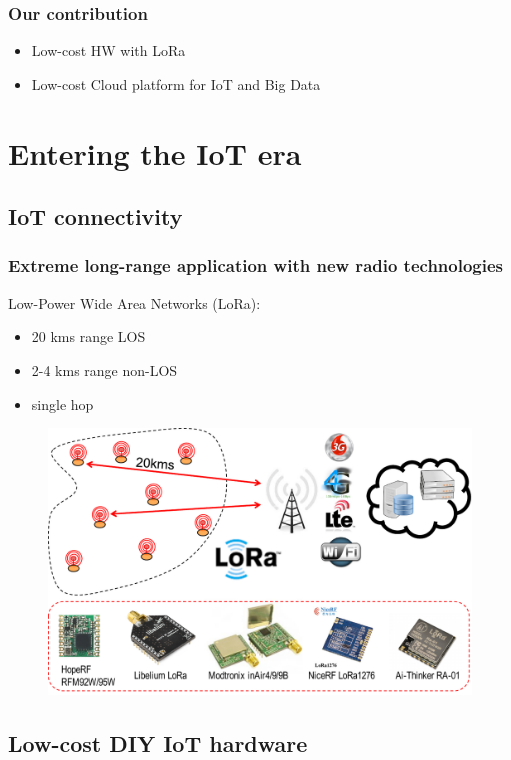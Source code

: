 \documentclass{beamer}
\begin{document}
\begin{frame}
\frametitle{Our contribution}
 
  \begin{itemize}
    \item Low-cost HW with LoRa  
    \item Low-cost Cloud platform for IoT and Big Data
  \end{itemize}

\end{frame}

\section{Entering the IoT era}

\subsection{IoT connectivity}

\begin{frame}
\frametitle{Extreme long-range application with new radio technologies}
Low-Power Wide Area Networks (LoRa):
  \begin{itemize}
    \item 20 kms range LOS
    \item 2-4 kms range non-LOS
    \item single hop
  \end{itemize}



\begin{figure}[H]  
\centering  
\includegraphics[width=.55\linewidth]{figures/1-hop}   
\label{figure-1hop}  
\end{figure} 
\end{frame}

\subsection{Low-cost DIY IoT hardware}
\end{document}
